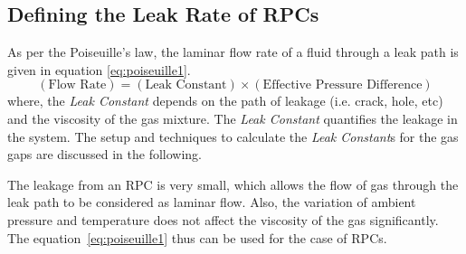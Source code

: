 \subsection{Defining the Leak Rate of RPCs}
As per the Poiseuille's law\cite{poiseuille}, the laminar flow rate of a fluid through a leak path is given in equation \ref{eq:poiseuille1}.
\begin{equation}
\left(\text{Flow Rate}\right)=\left(\text{Leak Constant}\right)\times\left(\text{Effective Pressure Difference}\right)\label{eq:poiseuille1}
\end{equation}
where, the \textit{Leak Constant} depends on the path of leakage (i.e. crack, hole, etc) and the viscosity of the gas mixture. The \textit{Leak Constant} quantifies the leakage in the system. The setup and techniques to calculate the \textit{Leak Constant}s for the gas gaps are discussed in the following.

The leakage from an RPC is very small, which allows the flow of gas through the leak path to be considered as laminar flow. Also, the variation of ambient pressure and temperature does not affect the viscosity of the gas significantly. The equation~\ref{eq:poiseuille1} thus can be used for the case of RPCs.

